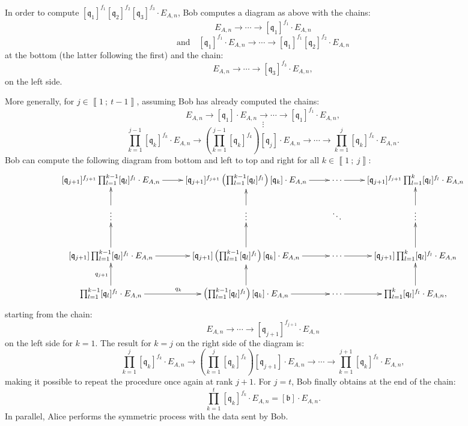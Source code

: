 \documentclass[a4paper,10pt,notitlepage]{report}
\theoremstyle{definition}
\theoremstyle{plain}
\theoremstyle{definition}
\renewcommand{\i}[2]{\left\llbracket #1~;~#2\right\rrbracket}
\renewcommand{\(}{\left(}
\renewcommand{\)}{\right)}
\newcommand{\mf}[1]{\mathfrak{#1}}
\newcommand{\mfq}{\mathfrak{q}}
\begin{document}
In order to compute $[\mf{q}_1]^{f_1}[\mf{q}_2]^{f_2}[\mf{q}_3]^{f_3}\cdot E_{A,n}$, Bob computes a diagram as above with the chains:
\[E_{A,n}\longrightarrow \cdots\longrightarrow [\mfq_1]^{f_1}\cdot E_{A,n}\]
\[\mbox{and} \quad [\mfq_1]^{f_1}\cdot E_{A,n}\longrightarrow \cdots\longrightarrow [\mfq_1]^{f_1}[\mf{q}_2]^{f_2}\cdot E_{A,n}\]
at the bottom (the latter following the first) and the chain:
\[E_{A,n}\longrightarrow \cdots\longrightarrow [\mfq_3]^{f_3}\cdot E_{A,n},\]
on the left side.

More generally, for $j\in\i{1}{t-1}$, assuming Bob has already computed the chains:
\[E_{A,n}\longrightarrow [\mf{q}_1]\cdot E_{A,n} \longrightarrow \cdots\longrightarrow [\mfq_1]^{f_1}\cdot E_{A,n},\]
\[\vdots\]
\[\prod_{k=1}^{j-1} [\mfq_k]^{f_k}\cdot E_{A,n}\longrightarrow \(\prod_{k=1}^{j-1} [\mfq_k]^{f_k}\)[\mf{q}_j]\cdot E_{A,n}\longrightarrow \cdots\longrightarrow \prod_{k=1}^{j} [\mfq_k]^{f_k}\cdot E_{A,n}.\]
Bob can compute the following diagram from bottom and left to top and right for all $k\in\i{1}{j}$:
\[\xymatrix{
[\mf{q}_{j+1}]^{f_{j+1}}\prod_{l=1}^{k-1} [\mfq_l]^{f_l} \cdot E_{A,n} \ar[r] & [\mf{q}_{j+1}]^{f_{j+1}}\(\prod_{l=1}^{k-1} [\mfq_l]^{f_l}\)[\mf{q}_{k}] \cdot E_{A,n}  \ar[r] & \cdots \ar[r] & [\mf{q}_{j+1}]^{f_{j+1}}\prod_{l=1}^{k} [\mfq_l]^{f_l} \cdot E_{A,n} \\
\vdots \ar[u] & \vdots \ar[u] & \ddots & \vdots \ar[u] \\
[\mf{q}_{j+1}]\prod_{l=1}^{k-1} [\mfq_l]^{f_l} \cdot E_{A,n} \ar[u] \ar[r] & [\mf{q}_{j+1}]\(\prod_{l=1}^{k-1} [\mfq_l]^{f_l}\)[\mf{q}_{k}] \cdot E_{A,n} \ar[u] \ar[r] & \cdots \ar[r] & [\mf{q}_{j+1}]\prod_{l=1}^{k} [\mfq_l]^{f_l} \cdot E_{A,n} \ar[u]\\
\prod_{l=1}^{k-1} [\mfq_l]^{f_l} \cdot E_{A,n} \ar[u]^{q_{j+1}} \ar[r]^{q_k} & \(\prod_{l=1}^{k-1} [\mfq_l]^{f_l}\)[\mf{q}_k] \cdot E_{A,n} \ar[u] \ar[r] & \cdots \ar[r] & \prod_{l=1}^{k} [\mfq_l]^{f_l} \cdot E_{A,n}, \ar[u]
}\]
starting from the chain:
\[E_{A,n}\longrightarrow \cdots\longrightarrow [\mfq_{j+1}]^{f_{j+1}}\cdot E_{A,n}\]
on the left side for $k=1$. The result for $k=j$ on the right side of the diagram is:
\[\prod_{k=1}^{j} [\mfq_k]^{f_k}\cdot E_{A,n}\longrightarrow \(\prod_{k=1}^{j} [\mfq_k]^{f_k}\)[\mf{q}_{j+1}]\cdot E_{A,n}\longrightarrow \cdots\longrightarrow \prod_{k=1}^{j+1} [\mfq_k]^{f_k}\cdot E_{A,n},\]
making it possible to repeat the procedure once again at rank $j+1$. For $j=t$, Bob finally obtains at the end of the chain:
\[\prod_{k=1}^{t} [\mfq_k]^{f_k}\cdot E_{A,n}=[\mf{b}]\cdot E_{A,n}.\]
In parallel, Alice performs the symmetric process with the data sent by Bob.
\end{document}
